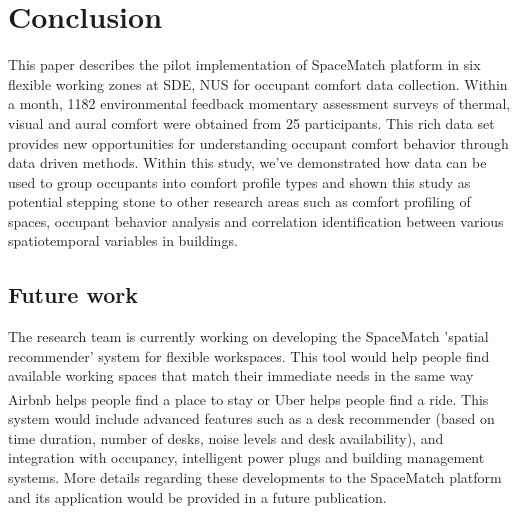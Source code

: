 \documentclass[]{interact}
\theoremstyle{plain}%
\theoremstyle{definition}
\theoremstyle{remark}
\begin{document}
\section{Conclusion}
This paper describes the pilot implementation of SpaceMatch platform in six flexible working zones at SDE, NUS for occupant comfort data collection. Within a month, 1182 environmental feedback momentary assessment surveys of thermal, visual and aural comfort were obtained from 25 participants. This rich data set provides new opportunities for understanding occupant comfort behavior through data driven methods. Within this study, we've demonstrated how data can be used to group occupants into comfort profile types and shown this study as potential stepping stone to other research areas such as comfort profiling of spaces, occupant behavior analysis and correlation identification between various spatiotemporal variables in buildings. 

\subsection{Future work}
The research team is currently working on developing the SpaceMatch 'spatial recommender' system for flexible workspaces. This tool would help people find available working spaces that match their immediate needs in the same way Airbnb\textsuperscript{\textregistered} helps people find a place to stay or Uber\textsuperscript{\textregistered} helps people find a ride. This system would include advanced features such as a desk recommender (based on time duration, number of desks, noise levels and desk availability), and integration with occupancy, intelligent power plugs and building management systems. More details regarding these developments to the SpaceMatch platform and its application would be provided in a future publication. 



\end{document}
